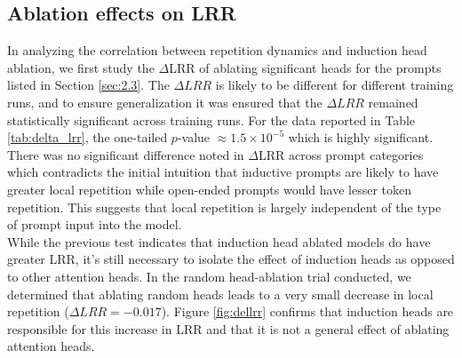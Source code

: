 \documentclass[twocolumn]{article}
\begin{document}
\subsection{Ablation effects on LRR}
\label{sec:ableff}
In analyzing the correlation between repetition dynamics and induction head ablation, we first study the $\Delta$LRR of ablating significant heads for the prompts listed in Section \ref{sec:2.3}. The $\Delta LRR$ is likely to be different for different training runs, and to ensure generalization it was ensured that the $\Delta LRR$ remained statistically significant across training runs. For the data reported in Table \ref{tab:delta_lrr}, the one-tailed $p$-value $\approx 1.5 \times 10^{-5}$ which is highly significant. There was no significant difference noted in $\Delta$LRR across prompt categories which contradicts the initial intuition that inductive prompts are likely to have greater local repetition while open-ended prompts would have lesser token repetition. This suggests that local repetition is largely independent of the type of prompt input into the model. \\

While the previous test indicates that induction head ablated models do have greater LRR, it's still necessary to isolate the effect of induction heads as opposed to other attention heads. In the random head-ablation trial conducted, we determined that ablating random heads leads to a very small decrease in local repetition ($\Delta LRR = -0.017$). Figure \ref{fig:dellrr} confirms that induction heads are responsible for this increase in LRR and that it is not a general effect of ablating attention heads.
\end{document}
